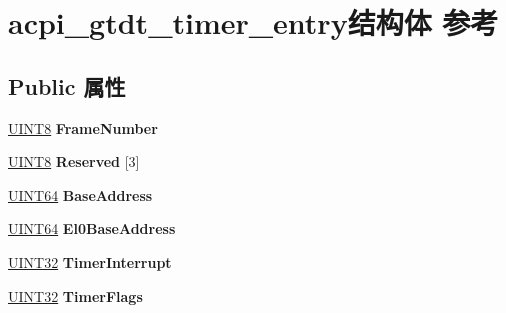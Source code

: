 \hypertarget{structacpi__gtdt__timer__entry}{}\section{acpi\+\_\+gtdt\+\_\+timer\+\_\+entry结构体 参考}
\label{structacpi__gtdt__timer__entry}
\subsection*{Public 属性}
\begin{DoxyCompactItemize}
\item 
\mbox{\label{structacpi__gtdt__timer__entry_ad59de4314b339cd71283225090322cba}} 
\hyperlink{_processor_bind_8h_ab27e9918b538ce9d8ca692479b375b6a}{U\+I\+N\+T8} {\bfseries Frame\+Number}
\item 
\mbox{\label{structacpi__gtdt__timer__entry_ac189c0010274ccb9404ab6cb216e3373}} 
\hyperlink{_processor_bind_8h_ab27e9918b538ce9d8ca692479b375b6a}{U\+I\+N\+T8} {\bfseries Reserved} \mbox{[}3\mbox{]}
\item 
\mbox{\label{structacpi__gtdt__timer__entry_a2114cf3d098c3ef015e418d736385975}} 
\hyperlink{_processor_bind_8h_a57be03562867144161c1bfee95ca8f7c}{U\+I\+N\+T64} {\bfseries Base\+Address}
\item 
\mbox{\label{structacpi__gtdt__timer__entry_a3f2573eeab17f968e77eaa4674e50384}} 
\hyperlink{_processor_bind_8h_a57be03562867144161c1bfee95ca8f7c}{U\+I\+N\+T64} {\bfseries El0\+Base\+Address}
\item 
\mbox{\label{structacpi__gtdt__timer__entry_a1037571c7d5e7b1e1c819b08a9209062}} 
\hyperlink{_processor_bind_8h_ae1e6edbbc26d6fbc71a90190d0266018}{U\+I\+N\+T32} {\bfseries Timer\+Interrupt}
\item 
\mbox{\label{structacpi__gtdt__timer__entry_afa77c92988a072491b1a5e7799614977}} 
\hyperlink{_processor_bind_8h_ae1e6edbbc26d6fbc71a90190d0266018}{U\+I\+N\+T32} {\bfseries Timer\+Flags}
\item 
\mbox{\label{structacpi__gtdt__timer__entry_a38bcfe852752ac7f65912c68a4430c84}} 

\end{DoxyCompactItemize}
